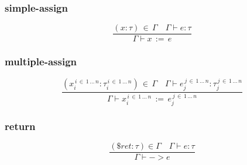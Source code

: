 \documentclass[a4paper,12pt]{article}
\newcommand\resw[1]{\mathtt{#1}}
\newcommand\mi[1]{\mathit{#1}}
\begin{document}
    \subsubsection{simple-assign}
    \[
        \frac{(\mi{x} \colon \tau) \, \in \, \Gamma \quad \Gamma \vdash \mi{e} \colon \tau}%
        {\Gamma \vdash \mi{x} \, \resw{:=} \, \mi{e}}
    \]
    \subsubsection{multiple-assign}
     \[
        \frac{(\mi{x}_{i}^{\, i \, \in \, 1 \, \dots \, n} \colon \tau_{i}^{\, i \, \in \, 1 \, \dots \, n}) \, \in \, \Gamma \quad \Gamma \vdash \mi{e}_{j}^{\, j \, \in \, 1 \, \dots \, n}%
        \colon \tau_{j}^{\, j \, \in \, 1 \, \dots \, n}}%
        {\Gamma \vdash \mi{x}_{i}^{\, i \, \in \, 1 \, \dots \, n} \, \resw{:=} \, \mi{e}_{j}^{\, j \, \in \, 1 \, \dots \, n}}
    \]
    \subsubsection{return}
    \[
    	\frac{(\$\mi{ret} \colon \tau) \in \Gamma \quad \Gamma \vdash \mi{e} \colon \tau}%
	{\Gamma \vdash \resw{-\!\!>} \mi{e}}
    \]

	\newpage
\end{document}
